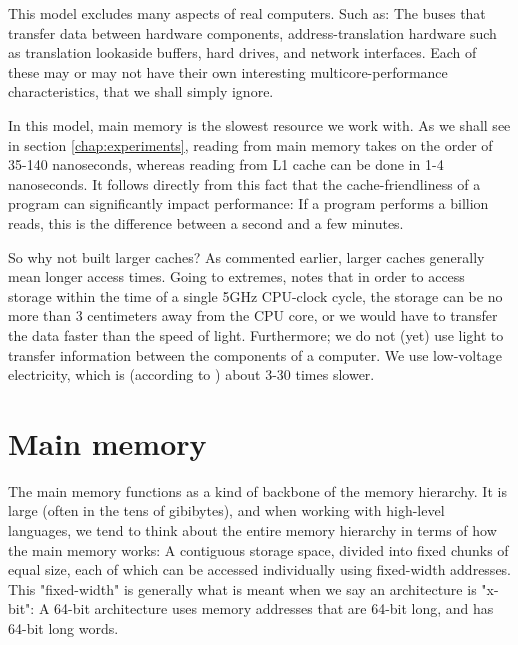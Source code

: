 This model excludes many aspects of real computers. Such as: The buses that
transfer data between hardware components, address-translation hardware such as
translation lookaside buffers, hard drives, and network interfaces. Each of
these may or may not have their own interesting multicore-performance
characteristics, that we shall simply ignore.

In this model, main memory is the slowest resource we work with. As we shall see
in section \ref{chap:experiments}, reading from main memory takes on the
order of 35-140 nanoseconds, whereas reading from L1 cache can be done in 1-4
nanoseconds. It follows directly from this fact that the cache-friendliness of a
program can significantly impact performance: If a program performs a billion
reads, this is the difference between a second and a few minutes.

So why not built larger caches? As commented earlier, larger caches generally
mean longer access times. Going to extremes, \citeauthor{mckenney} \cite{mckenney} notes that in order
to access storage within the time of a single 5GHz CPU-clock cycle, the storage
can be no more than 3 centimeters away from the CPU core, or we would have to
transfer the data faster than the speed of light. Furthermore; we do not (yet)
use light to transfer information between the components of a computer. We use
low-voltage electricity, which is (according to \cite{mckenney}) about 3-30
times slower.

\section{Main memory}
The main memory functions as a kind of backbone of the memory hierarchy. It is
large (often in the tens of gibibytes), and when working with high-level
languages, we tend to think about the entire memory
hierarchy in terms of how the main memory works: A contiguous storage space,
divided into fixed chunks of equal size, each of which can be
accessed individually using fixed-width addresses. This "fixed-width" is
generally what is meant when we say an architecture is "x-bit": A 64-bit
architecture uses memory addresses that are 64-bit long, and has 64-bit long
words.

